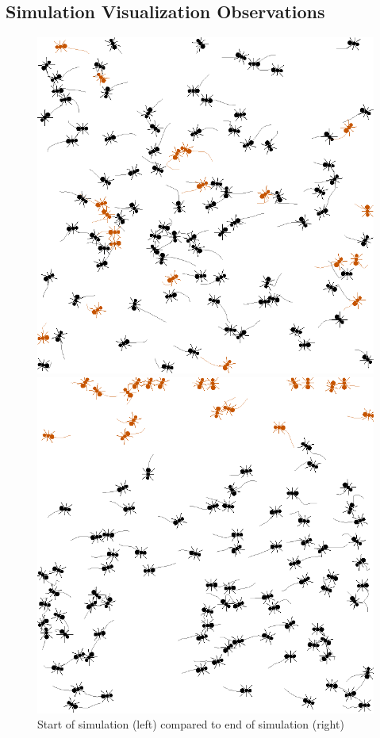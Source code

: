 \documentclass[9pt]{IEEEtran}
\begin{document}
\subsection{Simulation Visualization Observations}

\begin{figure}[hbt]
    \centering
    \begin{minipage}{0.2\textwidth}
        \centering
        \includegraphics[width=.9\linewidth]{frame_25.png}
    \end{minipage}
    \hspace{0.2cm}
    \begin{minipage}{0.2\textwidth}
        \centering
        \includegraphics[width=.9\linewidth]{frame_1300.png}
    \end{minipage}
    \caption{Start of simulation (left) compared to end of simulation (right)}
    \label{fig:trained_viz}
\end{figure}
\end{document}
